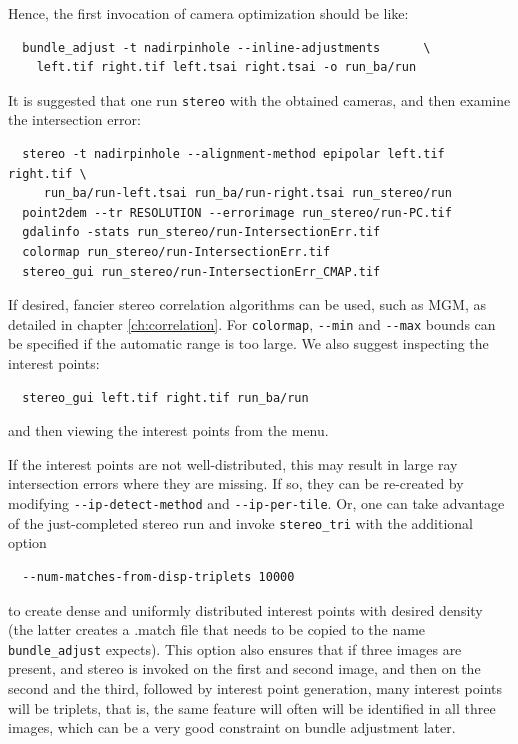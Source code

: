 Hence, the first invocation of camera optimization should be like:

\begin{verbatim}
  bundle_adjust -t nadirpinhole --inline-adjustments      \
    left.tif right.tif left.tsai right.tsai -o run_ba/run
\end{verbatim}

It is suggested that one run \texttt{stereo} with the obtained cameras, 
and then examine the intersection error:

\begin{verbatim}
  stereo -t nadirpinhole --alignment-method epipolar left.tif right.tif \
     run_ba/run-left.tsai run_ba/run-right.tsai run_stereo/run 
  point2dem --tr RESOLUTION --errorimage run_stereo/run-PC.tif
  gdalinfo -stats run_stereo/run-IntersectionErr.tif
  colormap run_stereo/run-IntersectionErr.tif
  stereo_gui run_stereo/run-IntersectionErr_CMAP.tif
\end{verbatim}

If desired, fancier stereo correlation algorithms can be used, such as MGM, as detailed in  
chapter \ref{ch:correlation}. For \texttt{colormap}, \texttt{-\/-min} and \texttt{-\/-max} 
bounds can be specified if the automatic range is too large. We also suggest inspecting
the interest points:
\begin{verbatim}
  stereo_gui left.tif right.tif run_ba/run
\end{verbatim}
and then viewing the interest points from the menu. 

If the interest points are not well-distributed, this may result in large ray intersection errors
where they are missing. If so, they can be re-created by modifying \texttt{-\/-ip-detect-method}
and \texttt{-\/-ip-per-tile}. Or, one can take advantage of the just-completed stereo run
and invoke \texttt{stereo\_tri} with the additional option 
\begin{verbatim} 
  --num-matches-from-disp-triplets 10000
\end{verbatim}

to create dense and uniformly distributed interest points with desired density
(the latter creates a .match file that needs to be copied to the name
\texttt{bundle\_adjust} expects). This option also ensures that if three
images are present, and stereo is invoked on the first and second image,
and then on the second and the third, followed by interest point generation,
many interest points will be triplets, that is, the same feature will often
will be identified in all three images, which
can be a very good constraint on bundle adjustment later.

